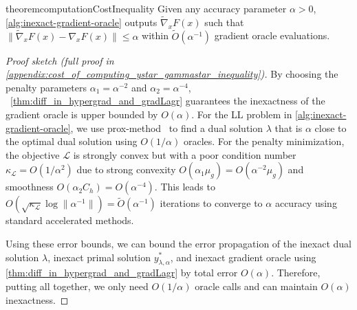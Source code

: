 
\begin{restatable}[]{theorem}{computationCostInequality}\label{thm:cost_of_computing_ystar_gammastar_inequality}
    Given any accuracy parameter $\alpha > 0$, \cref{alg:inexact-gradient-oracle} outputs $\widetilde{\nabla}_x F(x)$ such that $\|\widetilde{\nabla}_x F(x) - \nabla_x F(x)\| \leq \alpha$ within $\widetilde{O}({\alpha^{-1}})$ gradient oracle evaluations. 
\end{restatable}
\begin{proof}[Proof sketch (full proof in \cref{appendix:cost_of_computing_ystar_gammastar_inequality})]
    By choosing 
    the penalty parameters $\alpha_1 = \alpha^{-2}$ and $\alpha_2 = \alpha^{-4}$, ~\cref{thm:diff_in_hypergrad_and_gradLagr} guarantees the inexactness of the gradient oracle is upper bounded by $O(\alpha)$.
    For the LL problem in \cref{alg:inexact-gradient-oracle}, we use prox-method~\cite{nemirovski2004prox,golowich2020last} to find a dual solution $\lambda$ that is $\alpha$ close to the optimal dual solution using $O(1/\alpha)$ oracles.
    For the penalty minimization, the objective $\mathcal{L}$ is strongly convex but with a poor condition number $\kappa_\mathcal{L} = O(1 / \alpha^2)$ due to strong convexity $O(\alpha_1 \mu_g) = O( {\alpha^{-2} \mu_g})$ and smoothness $O(\alpha_2 C_h) = O(\alpha^{-4})$. This leads to $O(\sqrt{\kappa_\mathcal{L}} \log \| \alpha^{-1} \|) = \widetilde{O}({\alpha^{-1}})$ iterations to converge to $\alpha$ accuracy using standard accelerated methods.
    
    Using these error bounds, we can bound the error propagation of the inexact dual solution $\lambda$, inexact primal solution $y^*_{\lambda,\alpha}$, and inexact gradient oracle using \cref{thm:diff_in_hypergrad_and_gradLagr} by total error $O(\alpha)$.
    Therefore, putting all together, we only need $O(1/\alpha)$ oracle calls and can maintain $O(\alpha)$ inexactness.
\end{proof}

